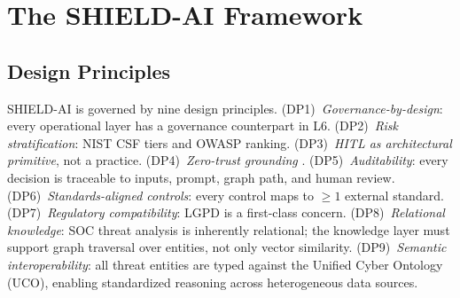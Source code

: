 \documentclass[journal]{IEEEtran}
\begin{document}
\begin{table}[!t]
\renewcommand{\arraystretch}{1.15}
\caption{LLM-specific risks with tiered controls.}
\label{tab:risks}
\centering
{}
\end{table}

\section{The SHIELD-AI Framework}
\label{sec:framework}

\subsection{Design Principles}
SHIELD-AI is governed by nine design principles.
(DP1)~\emph{Governance-by-design}: every operational layer has a governance counterpart in L6.
(DP2)~\emph{Risk stratification}: NIST CSF tiers and OWASP ranking.
(DP3)~\emph{HITL as architectural primitive}, not a practice.
(DP4)~\emph{Zero-trust grounding} \cite{nist2020sp800207}.
(DP5)~\emph{Auditability}: every decision is traceable to inputs, prompt, graph path,
and human review.
(DP6)~\emph{Standards-aligned controls}: every control maps to $\geq 1$ external standard.
(DP7)~\emph{Regulatory compatibility}: LGPD is a first-class concern.
(DP8)~\emph{Relational knowledge}: SOC threat analysis is inherently relational; the knowledge
layer must support graph traversal over entities, not only vector similarity.
(DP9)~\emph{Semantic interoperability}: all threat entities are typed against the
Unified Cyber Ontology (UCO), enabling standardized reasoning across heterogeneous data sources.
\end{document}
